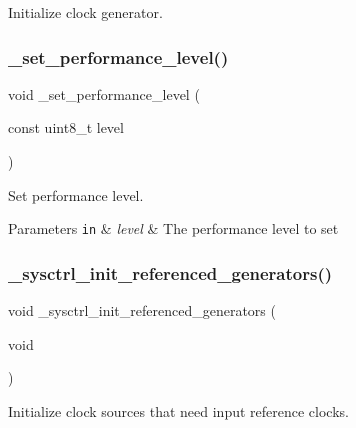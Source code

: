 Initialize clock generator. 

\mbox{\label{group___h_p_l_ga1668b7fc690ec56e1f3d54d9f3b8e5f2}} 
\subsubsection{\texorpdfstring{\+\_\+set\+\_\+performance\+\_\+level()}{\_set\_performance\_level()}}
{\footnotesize\ttfamily void \+\_\+set\+\_\+performance\+\_\+level (\begin{DoxyParamCaption}\item[{const uint8\+\_\+t}]{level }\end{DoxyParamCaption})}



Set performance level. 


\begin{DoxyParams}[1]{Parameters}
\mbox{\tt in}  & {\em level} & The performance level to set \\
\hline
\end{DoxyParams}
\mbox{\label{group___h_p_l_ga3e5e49081818470968093b6e3597ab5f}} 
\subsubsection{\texorpdfstring{\+\_\+sysctrl\+\_\+init\+\_\+referenced\+\_\+generators()}{\_sysctrl\_init\_referenced\_generators()}}
{\footnotesize\ttfamily void \+\_\+sysctrl\+\_\+init\+\_\+referenced\+\_\+generators (\begin{DoxyParamCaption}\item[{void}]{ }\end{DoxyParamCaption})}



Initialize clock sources that need input reference clocks. 

\mbox{\label{group___h_p_l_ga11bde7accfa853194b32dae4f27bad40}} 
